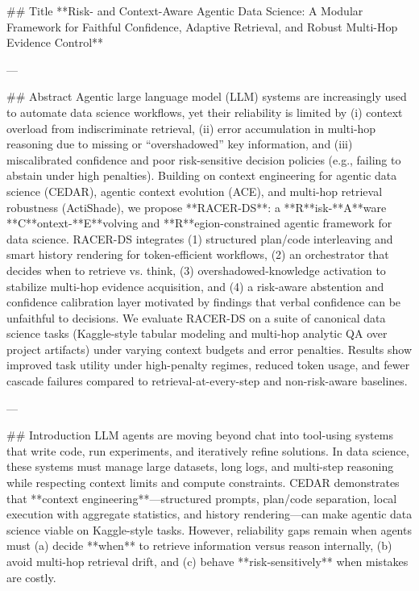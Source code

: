 ## Title  
**Risk- and Context-Aware Agentic Data Science: A Modular Framework for Faithful Confidence, Adaptive Retrieval, and Robust Multi-Hop Evidence Control**

---

## Abstract  
Agentic large language model (LLM) systems are increasingly used to automate data science workflows, yet their reliability is limited by (i) context overload from indiscriminate retrieval, (ii) error accumulation in multi-hop reasoning due to missing or “overshadowed” key information, and (iii) miscalibrated confidence and poor risk-sensitive decision policies (e.g., failing to abstain under high penalties). Building on context engineering for agentic data science (CEDAR), agentic context evolution (ACE), and multi-hop retrieval robustness (ActiShade), we propose **RACER-DS**: a **R**isk-**A**ware **C**ontext-**E**volving and **R**egion-constrained agentic framework for data science. RACER-DS integrates (1) structured plan/code interleaving and smart history rendering for token-efficient workflows, (2) an orchestrator that decides when to retrieve vs. think, (3) overshadowed-knowledge activation to stabilize multi-hop evidence acquisition, and (4) a risk-aware abstention and confidence calibration layer motivated by findings that verbal confidence can be unfaithful to decisions. We evaluate RACER-DS on a suite of canonical data science tasks (Kaggle-style tabular modeling and multi-hop analytic QA over project artifacts) under varying context budgets and error penalties. Results show improved task utility under high-penalty regimes, reduced token usage, and fewer cascade failures compared to retrieval-at-every-step and non-risk-aware baselines.  

---

## Introduction  
LLM agents are moving beyond chat into tool-using systems that write code, run experiments, and iteratively refine solutions. In data science, these systems must manage large datasets, long logs, and multi-step reasoning while respecting context limits and compute constraints. CEDAR demonstrates that **context engineering**—structured prompts, plan/code separation, local execution with aggregate statistics, and history rendering—can make agentic data science viable on Kaggle-style tasks. However, reliability gaps remain when agents must (a) decide **when** to retrieve information versus reason internally, (b) avoid multi-hop retrieval drift, and (c) behave **risk-sensitively** when mistakes are costly.

